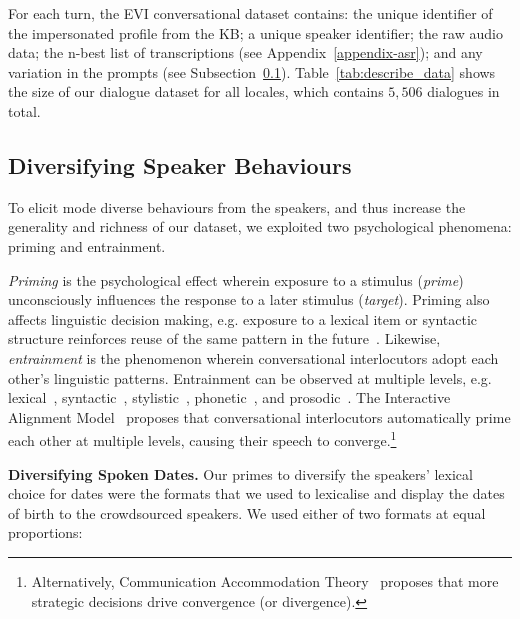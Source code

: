 \documentclass[11pt]{article}
\newcommand{\rparagraph}[1]{\vspace{1.4mm}\noindent\textbf{#1.}}
\begin{document}
{For each turn, the EVI conversational dataset contains:
the unique identifier of the impersonated profile from the KB;
a unique speaker identifier;
the raw audio data;
the n-best list of transcriptions (see Appendix~\ref{appendix-asr});
and any variation in the prompts
(see Subsection~\ref{sec:data-analysis}).
Table~\ref{tab:describe_data} shows the size of our dialogue dataset for all locales, which contains $5,506$ dialogues in total.

\subsection{{Diversifying Speaker Behaviours}}\label{sec:data-analysis}

{
To elicit mode diverse behaviours from the speakers,
and thus increase the generality and richness of our dataset,
we exploited two psychological phenomena: priming and entrainment.
}

\textit{Priming} is the psychological effect wherein exposure to a stimulus (\textit{prime})
unconsciously influences the response to a later stimulus (\textit{target}).
Priming also affects linguistic decision making,
e.g.
exposure to a lexical item or syntactic structure
reinforces reuse of the same pattern in the future~\cite{reitter2006computational,reitter2010priming}.
Likewise,
\textit{entrainment} is the phenomenon wherein
conversational interlocutors adopt each other's linguistic patterns.
Entrainment can be observed at multiple levels,
e.g.
lexical~\cite{brennan1996conceptual},
syntactic~\cite{reitter2007predicting},
stylistic~\cite{niederhoffer2002linguistic},
phonetic~\cite{pardo2006phonetic},
and prosodic~\cite{coulston2002amplitude}.
The Interactive Alignment Model~\cite{pickering2004toward}
proposes that conversational interlocutors automatically prime each other at multiple levels, causing their speech to converge.\footnote{Alternatively, Communication Accommodation Theory~\cite{giles19911}
proposes that more strategic decisions drive convergence (or divergence).}

\rparagraph{Diversifying Spoken Dates} Our primes
to diversify the speakers' lexical choice for dates
were the formats that we used
to lexicalise and display the dates of birth
to the crowdsourced speakers.
We used either of two formats at equal proportions:


}
\end{document}
